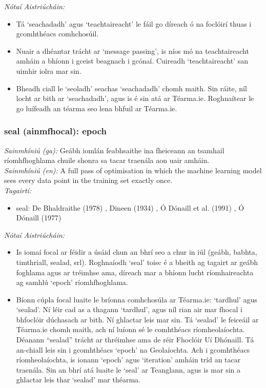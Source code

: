  \noindent \textit{Nótaí Aistriúcháin:}
\begin{itemize}
	\item Tá `seachadadh' agus `teachtaireacht' le fáil go díreach ó na foclóirí thuas i gcomhthéacs comhchosúil.
	\item Nuair a dhéantar trácht ar `message passing', is níos mó na teachtaireacht amháin a bhíonn i gceist beagnach i gcónaí. Cuireadh `teachtaireacht' san uimhir iolra mar sin.
	\item Bheadh ciall le `seoladh' seachas `seachadadh' chomh maith. Sin ráite, níl locht ar bith ar `seachadadh', agus is é sin atá ar Téarma.ie. Roghnaítear le go luífeadh an téarma seo lena bhfuil ar Téarma.ie.
\end{itemize}


\subsubsection*{seal (ainmfhocal): epoch}
 \noindent \textit{Sainmhíniú (ga):}  Geábh iomlán feabhsaithe ina fheiceann an tsamhail ríomhfhoghlama chuile shonra sa tacar traenála aon uair amháin.
\\
 \noindent \textit{Sainmhíniú (en):} A full pass of optimisation in which the machine learning model sees every data point in the training set exactly once.
\\
 \noindent \textit{Tagairtí:}
\begin{itemize}
	\item seal: De Bhaldraithe (1978) \cite{de-bhaldraithe}, Dineen (1934) \cite{dineen}, Ó Dónaill et al. (1991) \cite{focloir-beag}, Ó Dónaill (1977) \cite{odonaill}
\end{itemize}

 \noindent \textit{Nótaí Aistriúcháin:}
\begin{itemize}
	\item Is iomaí focal ar féidir a úsáid chun an bhrí seo a chur in iúl (geábh, babhta, timthriall, sealad, srl). Roghnaíodh `seal' toisc é a bheith ag tagairt ar geábh foghlama agus ar tréimhse ama, díreach mar a bhíonn lucht ríomhaireachta ag samhlú `epoch' ríomhfhoghlama.
	\item Bíonn cúpla focal luaite le bríonna comhchosúla ar Téarma.ie: `tardhul' agus `sealad'. Ní léir cad as a thagann `tardhul', agus níl rian air mar fhocal i bhfoclóir dúchasach ar bith. Ní ghlactar leis mar sin. Tá `sealad' le feiceáil ar Téarma.ie chomh maith, ach ní luíonn sé le comhthéacs ríomheolaíochta. Déanann “sealad” trácht ar thréimhse ama de réir Fhoclóir Uí Dhónaill. Tá an-chiall leis sin i gcomhthéacs `epoch' na Geolaíochta. Ach i gcomhthéacs ríomheolaíochta, is ionann `epoch' agus `iteration' amháin tríd an tacar traenála. Sin an bhrí atá luaite le `seal' ar Teanglann, agus is mar sin a ghlactar leis thar `sealad' mar théarma.
\end{itemize}



